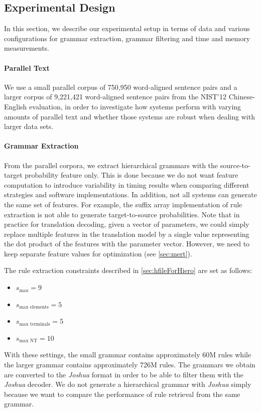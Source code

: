 \subsection{Experimental Design}

In this section, we describe our experimental setup in terms of data and various
configurations for grammar extraction, grammar filtering and
time and memory measurements.
%
\paragraph{Parallel Text} We use a small parallel corpus of 750,950 word-aligned sentence
    pairs and a larger corpus of 9,221,421 word-aligned sentence pairs from the
    NIST'12 Chinese-English evaluation, in order to investigate how systems perform %
    with varying amounts of parallel text and whether those systems are robust
    when dealing with larger data sets.
%
\paragraph{Grammar Extraction} From the parallel corpora, we extract hierarchical
    grammars with the source-to-target probability feature only. This is done
    because we do
    not want feature computation to introduce variability in timing results when
    comparing different strategies and software implementations. In addition, not
    all systems can generate the same set of features. For example,
    the suffix array implementation of rule extraction is not able to generate
    target-to-source probabilities. Note that in practice for
    translation decoding, given a vector of
    parameters, we could simply replace multiple features in the translation
    model by a single value representing the dot product of the features with
    the parameter vector. However, we need to keep separate feature values for
    optimization (see \autoref{sec:mert}).

    The rule extraction constraints described in \autoref{sec:hfileForHiero}
    are set as follows:
%
\begin{itemize}
  \item $ s_{\text{max}}= 9$
  \item $s_{\text{max elements}} = 5$
  \item $s_{\text{max terminals}} = 5$ %
  \item $s_{\text{max NT}} = 10$ %
\end{itemize}
%
With these settings, the small grammar contains approximately 60M rules while the 
larger grammar contains approximately 726M rules. The grammars we obtain are
converted to the \emph{Joshua} format in order to be able to filter them
with the \emph{Joshua} decoder. We do not generate a hierarchical grammar
with \emph{Joshua} simply because we want to compare the performance of
rule retrieval from the same grammar.
%
